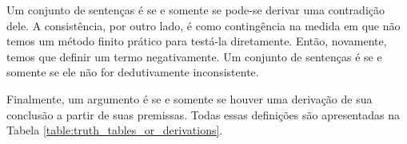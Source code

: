 Um  conjunto de senten\c cas \'e  \label{def:syntactically_inconsistent_ in_sl}  se e somente se pode-se derivar uma contradi\c c\~ao dele. A consist\^encia, por outro lado, \'e como conting\^encia na medida em que n\~ao temos um m\'etodo finito pr\'atico para test\'a-la diretamente. Ent\~ao, novamente, temos que definir um termo negativamente. Um  conjunto de senten\c cas \'e  \label{def:syntactically consistent in SL} se e somente se ele n\~ao for dedutivamente inconsistente.
    
Finalmente, um argumento \'e   \label{def:syntactically_valid_in_SL}se e somente se houver uma deriva\c c\~ao de sua conclus\~ao a partir de suas premissas. Todas essas defini\c c\~oes s\~ao apresentadas na Tabela \ref{table:truth_tables_or_derivations}.

